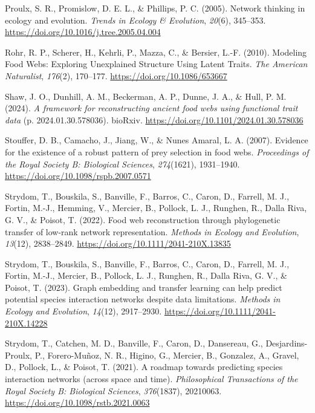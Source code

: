 \documentclass[
]{article}
\newlength{\cslhangindent}
\newenvironment{CSLReferences}[2] %
 {\begin{list}{}{%
  \setlength{\itemindent}{0pt}
  \setlength{\leftmargin}{0pt}
  \setlength{\parsep}{0pt}
  \ifodd #1
   \setlength{\leftmargin}{\cslhangindent}
   \setlength{\itemindent}{-1\cslhangindent}
  \fi
  \setlength{\itemsep}{#2\baselineskip}}}
 {\end{list}}
\begin{document}
\begin{CSLReferences}{1}{0}
Proulx, S. R., Promislow, D. E. L., \& Phillips, P. C. (2005). Network
thinking in ecology and evolution. \emph{Trends in Ecology \&
Evolution}, \emph{20}(6), 345--353.
\url{https://doi.org/10.1016/j.tree.2005.04.004}

Rohr, R. P., Scherer, H., Kehrli, P., Mazza, C., \& Bersier, L.-F.
(2010). Modeling {Food Webs}: {Exploring Unexplained Structure Using
Latent Traits}. \emph{The American Naturalist}, \emph{176}(2), 170--177.
\url{https://doi.org/10.1086/653667}

Shaw, J. O., Dunhill, A. M., Beckerman, A. P., Dunne, J. A., \& Hull, P.
M. (2024). \emph{A framework for reconstructing ancient food webs using
functional trait data} (p. 2024.01.30.578036). bioRxiv.
\url{https://doi.org/10.1101/2024.01.30.578036}

Stouffer, D. B., Camacho, J., Jiang, W., \& Nunes Amaral, L. A. (2007).
Evidence for the existence of a robust pattern of prey selection in food
webs. \emph{Proceedings of the Royal Society B: Biological Sciences},
\emph{274}(1621), 1931--1940.
\url{https://doi.org/10.1098/rspb.2007.0571}

Strydom, T., Bouskila, S., Banville, F., Barros, C., Caron, D., Farrell,
M. J., Fortin, M.-J., Hemming, V., Mercier, B., Pollock, L. J., Runghen,
R., Dalla Riva, G. V., \& Poisot, T. (2022). Food web reconstruction
through phylogenetic transfer of low-rank network representation.
\emph{Methods in Ecology and Evolution}, \emph{13}(12), 2838--2849.
\url{https://doi.org/10.1111/2041-210X.13835}

Strydom, T., Bouskila, S., Banville, F., Barros, C., Caron, D., Farrell,
M. J., Fortin, M.-J., Mercier, B., Pollock, L. J., Runghen, R., Dalla
Riva, G. V., \& Poisot, T. (2023). Graph embedding and transfer learning
can help predict potential species interaction networks despite data
limitations. \emph{Methods in Ecology and Evolution}, \emph{14}(12),
2917--2930. \url{https://doi.org/10.1111/2041-210X.14228}

Strydom, T., Catchen, M. D., Banville, F., Caron, D., Dansereau, G.,
Desjardins-Proulx, P., Forero-Muñoz, N. R., Higino, G., Mercier, B.,
Gonzalez, A., Gravel, D., Pollock, L., \& Poisot, T. (2021). A roadmap
towards predicting species interaction networks (across space and time).
\emph{Philosophical Transactions of the Royal Society B: Biological
Sciences}, \emph{376}(1837), 20210063.
\url{https://doi.org/10.1098/rstb.2021.0063}


\end{CSLReferences}
\end{document}
